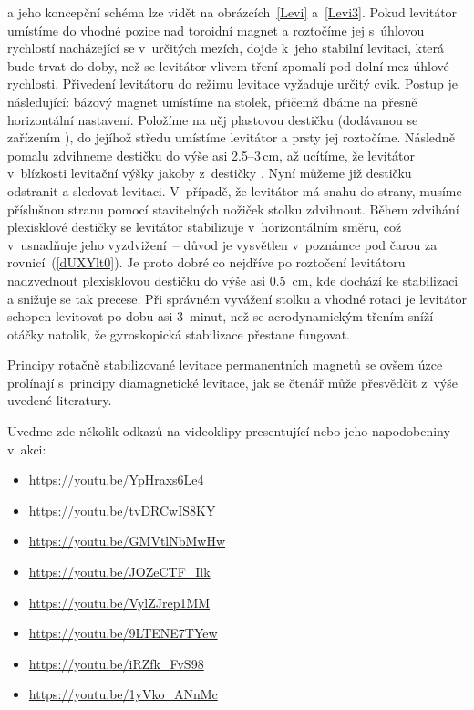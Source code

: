 \Levit{} a jeho koncepční schéma lze vidět na
obrázcích~\ref{Levi} a~\ref{Levi3}. Pokud levitátor umístíme do vhodné pozice
nad toroidní magnet a roztočíme jej s~úhlovou rychlostí nacházející se
v~určitých mezích, dojde k~jeho stabilní levitaci, která bude trvat do doby,
než se levitátor vlivem tření zpomalí pod dolní mez úhlové
rychlosti. Přivedení levitátoru do režimu levitace vyžaduje určitý
cvik. Postup je následující: bázový magnet umístíme na stolek, přičemž dbáme
na přesně horizontální nastavení. Položíme na něj plastovou destičku
(dodávanou se zařízením \Levit{}), do jejíhož středu umístíme levitátor a
prsty jej roztočíme. Následně pomalu zdvihneme destičku do výše asi
2.5--3\,cm, až ucítíme, že levitátor v~blízkosti levitační výšky jakoby
z~destičky .  Nyní můžeme již destičku odstranit a sledovat
levitaci. V~případě, že levitátor má snahu  do strany, musíme
příslušnou stranu pomocí stavitelných nožiček stolku zdvihnout. Během zdvihání
plexisklové destičky se levitátor stabilizuje v~horizontálním směru, což
v~usnadňuje jeho vyzdvižení~-- důvod je vysvětlen v~poznámce pod čarou za
rovnicí~(\ref{dUXYlt0}). Je proto dobré co nejdříve po roztočení levitátoru
nadzvednout plexisklovou destičku do výše asi 0.5~cm, kde dochází ke
stabilizaci a snižuje se tak precese. Při správném vyvážení stolku a vhodné
rotaci je levitátor schopen levitovat po dobu asi 3~minut, než se
aerodynamickým třením sníží otáčky natolik, že gyroskopická stabilizace
přestane fungovat.

Principy rotačně stabilizované levitace permanentních magnetů se ovšem úzce
prolínají s~principy diamagnetické levitace, jak se čtenář může přesvědčit
z~výše uvedené literatury.

Uveďme zde několik odkazů na videoklipy presentující \Levit{} nebo jeho
napodobeniny v~akci:
\begin{itemize}
\item\url{https://youtu.be/YpHraxs6Le4}
\item\url{https://youtu.be/tvDRCwIS8KY}
\item\url{https://youtu.be/GMVtlNbMwHw}
\item\url{https://youtu.be/JOZeCTF_Ilk}
\item\url{https://youtu.be/VylZJrep1MM}
\item\url{https://youtu.be/9LTENE7TYew}
\item\url{https://youtu.be/iRZfk_FvS98}
\item\url{https://youtu.be/1yVko_ANnMc}
\end{itemize}

